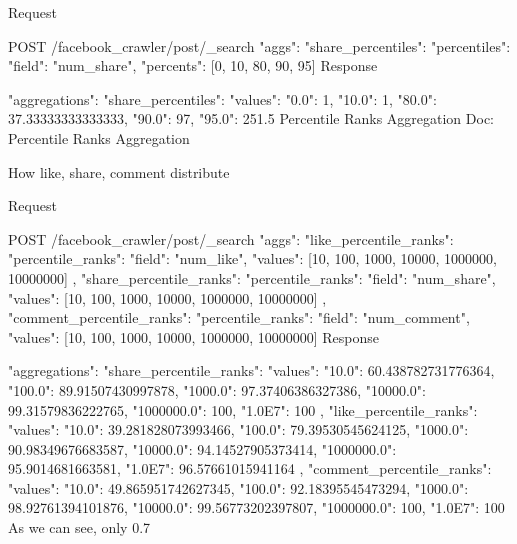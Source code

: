 Request

POST /facebook_crawler/post/_search
{
   "aggs": {
      "share_percentiles": {
         "percentiles": {
            "field": "num_share",
            "percents": [0, 10, 80, 90, 95]
         }
      }
   }
}
Response

{
   "aggregations": {
      "share_percentiles": {
         "values": {
            "0.0": 1,
            "10.0": 1,
            "80.0": 37.33333333333333,
            "90.0": 97,
            "95.0": 251.5
         }
      }
   }
}
Percentile Ranks Aggregation
Doc: Percentile Ranks Aggregation

How like, share, comment distribute

Request

POST /facebook_crawler/post/_search
{
   "aggs": {
      "like_percentile_ranks": {
         "percentile_ranks": {
            "field": "num_like",
            "values": [10, 100, 1000, 10000, 1000000, 10000000]
         }
      },
      "share_percentile_ranks": {
         "percentile_ranks": {
            "field": "num_share",
            "values": [10, 100, 1000, 10000, 1000000, 10000000]
         }
      },
      "comment_percentile_ranks": {
         "percentile_ranks": {
            "field": "num_comment",
            "values": [10, 100, 1000, 10000, 1000000, 10000000]
         }
      }
   }
}
Response

{
   "aggregations": {
      "share_percentile_ranks": {
         "values": {
            "10.0": 60.438782731776364,
            "100.0": 89.91507430997878,
            "1000.0": 97.37406386327386,
            "10000.0": 99.31579836222765,
            "1000000.0": 100,
            "1.0E7": 100
         }
      },
      "like_percentile_ranks": {
         "values": {
            "10.0": 39.281828073993466,
            "100.0": 79.39530545624125,
            "1000.0": 90.98349676683587,
            "10000.0": 94.14527905373414,
            "1000000.0": 95.9014681663581,
            "1.0E7": 96.57661015941164
         }
      },
      "comment_percentile_ranks": {
         "values": {
            "10.0": 49.865951742627345,
            "100.0": 92.18395545473294,
            "1000.0": 98.92761394101876,
            "10000.0": 99.56773202397807,
            "1000000.0": 100,
            "1.0E7": 100
         }
      }
   }
}
As we can see, only 0.7%

